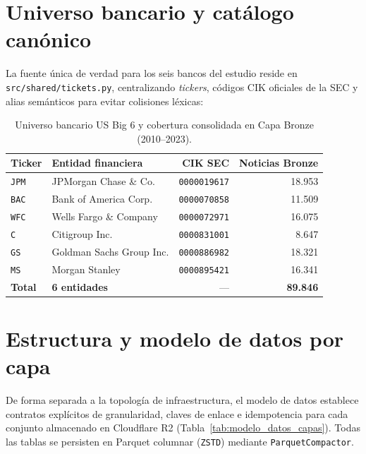 \section{Universo bancario y catálogo canónico}
La fuente única de verdad para los seis bancos del estudio reside en \texttt{src/shared/tickets.py}, centralizando \textit{tickers}, códigos CIK oficiales de la SEC y alias semánticos para evitar colisiones léxicas:

\begin{table}[H]
    \centering
    \caption{Universo bancario US Big 6 y cobertura consolidada en Capa Bronze (2010--2023).}
    \label{tab:universo_big6}
    \begin{tabular}{@{}llrr@{}}
        \toprule
        \textbf{Ticker} & \textbf{Entidad financiera} & \textbf{CIK SEC} & \textbf{Noticias Bronze} \\
        \midrule
        \texttt{JPM} & JPMorgan Chase \& Co.        & \texttt{0000019617} & 18.953 \\
        \texttt{BAC} & Bank of America Corp.        & \texttt{0000070858} & 11.509 \\
        \texttt{WFC} & Wells Fargo \& Company       & \texttt{0000072971} & 16.075 \\
        \texttt{C}   & Citigroup Inc.               & \texttt{0000831001} &  8.647 \\
        \texttt{GS}  & Goldman Sachs Group Inc.     & \texttt{0000886982} & 18.321 \\
        \texttt{MS}  & Morgan Stanley               & \texttt{0000895421} & 16.341 \\
        \midrule
        \textbf{Total} & \textbf{6 entidades} & --- & \textbf{89.846} \\
        \bottomrule
    \end{tabular}
\end{table}

\section{Estructura y modelo de datos por capa}
De forma separada a la topología de infraestructura, el modelo de datos establece contratos explícitos de granularidad, claves de enlace e idempotencia para cada conjunto almacenado en Cloudflare R2 (Tabla~\ref{tab:modelo_datos_capas}). Todas las tablas se persisten en Parquet columnar (\texttt{ZSTD}) mediante \texttt{ParquetCompactor}.

